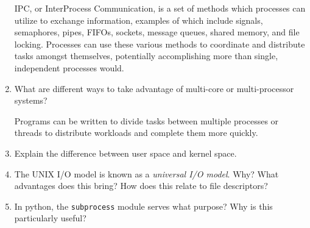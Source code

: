 \documentclass[letterpaper,10pt,onecolumn,titlepage]{article}
\begin{document}
\begin{enumerate}[itemsep=0.1 in]
IPC, or InterProcess Communication, is a set of methods which processes can utilize to exchange information, examples of which include signals, semaphores, pipes, FIFOs, sockets, message queues, shared memory, and file locking.  Processes can use these various methods to coordinate and distribute tasks amongst themselves, potentially accomplishing more than single, independent processes would.

\item What are different ways to take advantage of multi-core or multi-processor systems?

Programs can be written to divide tasks between multiple processes or threads to distribute workloads and complete them more quickly.

\item Explain the difference between user space and kernel space.



\item The UNIX I/O model is known as a \emph{universal I/O model}. Why? What advantages
  does this bring? How does this relate to file descriptors?

\item\label{last} In python, the \texttt{subprocess} module serves what purpose? Why is
  this particularly useful?


\end{enumerate}

\end{document}
